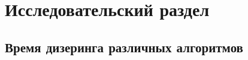 \chapter{Исследовательский раздел}
\label{cha:research}
\section{Время дизеринга различных алгоритмов}


